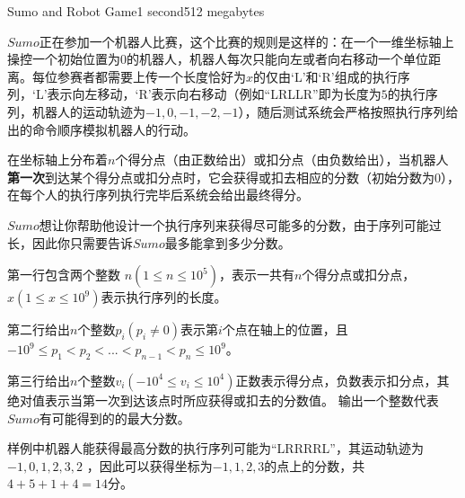 \documentclass[11pt,a4paper,oneside]{article}
\begin{document}
\begin{problem}{Sumo and Robot Game}{}{}{1 second}{512 megabytes}
	
	$Sumo$正在参加一个机器人比赛，这个比赛的规则是这样的：在一个一维坐标轴上操控一个初始位置为$0$的机器人，机器人每次只能向左或者向右移动一个单位距离。每位参赛者都需要上传一个长度恰好为$x$的仅由‘L’和‘R’组成的执行序列，‘L’表示向左移动，‘R’表示向右移动（例如“LRLLR”即为长度为$5$的执行序列，机器人的运动轨迹为$-1,0,-1,-2,-1$），随后测试系统会严格按照执行序列给出的命令顺序模拟机器人的行动。
	
	在坐标轴上分布着$n$个得分点（由正数给出）或扣分点（由负数给出），当机器人\textbf{第一次}到达某个得分点或扣分点时，它会获得或扣去相应的分数（初始分数为$0$），在每个人的执行序列执行完毕后系统会给出最终得分。
	
	$Sumo$想让你帮助他设计一个执行序列来获得尽可能多的分数，由于序列可能过长，因此你只需要告诉$Sumo$最多能拿到多少分数。
	
	\InputFile
	第一行包含两个整数 $n(1 \leq n \leq 10^5)$，表示一共有$n$个得分点或扣分点，$x(1 \leq x \leq 10^9)$表示执行序列的长度。
	
	第二行给出$n$个整数$p_i (p_i \neq 0)$表示第$i$个点在轴上的位置，且$-10^9\leq p_1<p_2<...<p_{n-1}<p_{n}\leq 10^9$。
	
	第三行给出$n$个整数$v_i(-10^4\leq v_i\leq 10^4)$正数表示得分点，负数表示扣分点，其绝对值表示当第一次到达该点时所应获得或扣去的分数值。
	\OutputFile
	输出一个整数代表$Sumo$有可能得到的的最大分数。
	\Examples
	\begin{example}
	\end{example}
	\Explanation
	样例中机器人能获得最高分数的执行序列可能为“LRRRRL”，其运动轨迹为$-1,0,1,2,3,2$ ，因此可以获得坐标为$-1,1,2,3$的点上的分数，共$4+5+1+4=14$分。
	
	
\end{problem}
\end{document}
